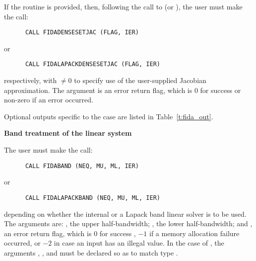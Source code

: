 \begin{Steps}
  If the  routine is provided, then, following the call to  
  (or ), the user must make the call:
\begin{verbatim}
      CALL FIDADENSESETJAC (FLAG, IER)
\end{verbatim}
  or
\begin{verbatim}
      CALL FIDALAPACKDENSESETJAC (FLAG, IER)
\end{verbatim}
  respectively, with  $\neq 0$ to specify use of the user-supplied Jacobian
  approximation.  The argument  is an error return flag, which is $0$ 
  for success or non-zero if an error occurred.
  
  Optional outputs specific to the {\dense} case are listed in
  Table~\ref{t:fida_out}.


  {\s} {\bf Band treatment of the linear system}
  
  The user must make the call:
\begin{verbatim}
      CALL FIDABAND (NEQ, MU, ML, IER)
\end{verbatim}
  or
\begin{verbatim}
      CALL FIDALAPACKBAND (NEQ, MU, ML, IER)
\end{verbatim}
  depending on whether the internal or a Lapack band linear solver is to be used.
  The arguments are: , the upper half-bandwidth; , 
  the lower half-bandwidth; and , an error return flag, which is  
  $0$ for success , $-1$ if a memory allocation failure occurred, or $-2$ 
  in case an input has an illegal value.     
  In the case of , the arguments , , and 
  must be declared so as to match {\C} type .


\end{Steps}
